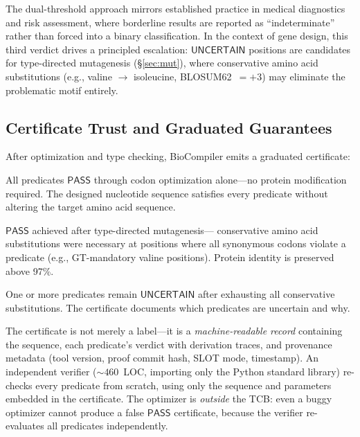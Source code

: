 \documentclass[acmsmall,review,anonymous]{acmart}
\newcommand{\PASS}{\ensuremath{\mathsf{PASS}}\xspace}
\newcommand{\UNCERTAIN}{\ensuremath{\mathsf{UNCERTAIN}}\xspace}
\newcommand{\GOLD}{\textsc{Gold}\xspace}
\newcommand{\SILVER}{\textsc{Silver}\xspace}
\newcommand{\BRONZE}{\textsc{Bronze}\xspace}
\begin{document}
The dual-threshold approach mirrors established practice in medical
diagnostics and risk assessment, where borderline results are reported
as ``indeterminate'' rather than forced into a binary classification.
In the context of gene design, this third verdict drives a principled
escalation: \UNCERTAIN{} positions are candidates for type-directed
mutagenesis (\S\ref{sec:mut}), where conservative amino acid
substitutions (e.g., valine $\to$ isoleucine, BLOSUM62~$= +3$) may
eliminate the problematic motif entirely.

\subsection{Certificate Trust and Graduated Guarantees}

After optimization and type checking, BioCompiler emits a graduated
certificate:
\begin{description}[leftmargin=!,labelwidth=1.4cm,itemsep=1pt,
                     topsep=1pt]
\item[\GOLD] All predicates \PASS{} through codon optimization
      alone---no protein modification required.
      The designed nucleotide sequence satisfies every predicate
      without altering the target amino acid sequence.
\item[\SILVER] \PASS{} achieved after type-directed mutagenesis---
      conservative amino acid substitutions were necessary at positions
      where all synonymous codons violate a predicate (e.g.,
      GT-mandatory valine positions).
      Protein identity is preserved above 97\%.
\item[\BRONZE] One or more predicates remain \UNCERTAIN{}
      after exhausting all conservative substitutions.
      The certificate documents which predicates are uncertain and why.
\end{description}

The certificate is not merely a label---it is a \emph{machine-readable
record} containing the sequence, each predicate's verdict with
derivation traces, and provenance metadata (tool version, proof commit
hash, SLOT mode, timestamp).
An independent verifier (${\sim}460$~LOC, importing only the Python
standard library) re-checks every predicate from scratch, using only
the sequence and parameters embedded in the certificate.
The optimizer is \emph{outside} the TCB: even a buggy optimizer
cannot produce a false \PASS{} certificate, because the verifier
re-evaluates all predicates independently.
\end{document}
